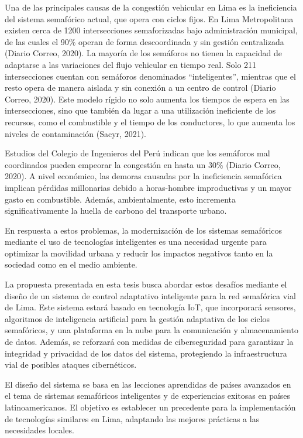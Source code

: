 \documentclass[12pt,a4paper,oneside]{report}
\begin{document}
Una de las principales causas de la congestión vehicular en Lima es la ineficiencia del sistema semafórico actual, que opera con ciclos fijos. En Lima Metropolitana existen cerca de 1200 intersecciones semaforizadas bajo administración municipal, de las cuales el 90\% operan de forma descoordinada y sin gestión centralizada (Diario Correo, 2020). La mayoría de los semáforos no tienen la capacidad de adaptarse a las variaciones del flujo vehicular en tiempo real. Solo 211 intersecciones cuentan con semáforos denominados ``inteligentes'', mientras que el resto opera de manera aislada y sin conexión a un centro de control (Diario Correo, 2020). Este modelo rígido no solo aumenta los tiempos de espera en las intersecciones, sino que también da lugar a una utilización ineficiente de los recursos, como el combustible y el tiempo de los conductores, lo que aumenta los niveles de contaminación (Sacyr, 2021).

Estudios del Colegio de Ingenieros del Perú indican que los semáforos mal coordinados pueden empeorar la congestión en hasta un 30\% (Diario Correo, 2020). A nivel económico, las demoras causadas por la ineficiencia semafórica implican pérdidas millonarias debido a horas-hombre improductivas y un mayor gasto en combustible. Además, ambientalmente, esto incrementa significativamente la huella de carbono del transporte urbano.

En respuesta a estos problemas, la modernización de los sistemas semafóricos mediante el uso de tecnologías inteligentes es una necesidad urgente para optimizar la movilidad urbana y reducir los impactos negativos tanto en la sociedad como en el medio ambiente.

La propuesta presentada en esta tesis busca abordar estos desafíos mediante el diseño de un sistema de control adaptativo inteligente para la red semafórica vial de Lima. Este sistema estará basado en tecnología IoT, que incorporará sensores, algoritmos de inteligencia artificial para la gestión adaptativa de los ciclos semafóricos, y una plataforma en la nube para la comunicación y almacenamiento de datos. Además, se reforzará con medidas de ciberseguridad para garantizar la integridad y privacidad de los datos del sistema, protegiendo la infraestructura vial de posibles ataques cibernéticos.

El diseño del sistema se basa en las lecciones aprendidas de países avanzados en el tema de sistemas semafóricos inteligentes y de experiencias exitosas en países latinoamericanos. El objetivo es establecer un precedente para la implementación de tecnologías similares en Lima, adaptando las mejores prácticas a las necesidades locales.
\end{document}

